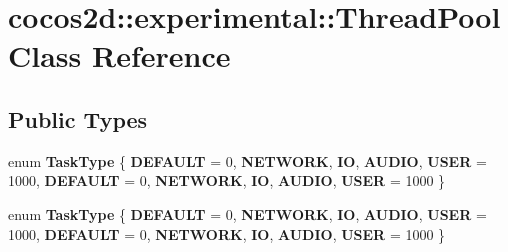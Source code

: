 \hypertarget{classcocos2d_1_1experimental_1_1ThreadPool}{}\section{cocos2d\+:\+:experimental\+:\+:Thread\+Pool Class Reference}
\label{classcocos2d_1_1experimental_1_1ThreadPool}
\subsection*{Public Types}
\begin{DoxyCompactItemize}
\item 
\mbox{\label{classcocos2d_1_1experimental_1_1ThreadPool_a0e578b9707fd927ab2413ffef9c3992e}} 
enum {\bfseries Task\+Type} \{ \newline
{\bfseries D\+E\+F\+A\+U\+LT} = 0, 
{\bfseries N\+E\+T\+W\+O\+RK}, 
{\bfseries IO}, 
{\bfseries A\+U\+D\+IO}, 
\newline
{\bfseries U\+S\+ER} = 1000, 
{\bfseries D\+E\+F\+A\+U\+LT} = 0, 
{\bfseries N\+E\+T\+W\+O\+RK}, 
{\bfseries IO}, 
\newline
{\bfseries A\+U\+D\+IO}, 
{\bfseries U\+S\+ER} = 1000
 \}
\item 
\mbox{\label{classcocos2d_1_1experimental_1_1ThreadPool_a0e578b9707fd927ab2413ffef9c3992e}} 
enum {\bfseries Task\+Type} \{ \newline
{\bfseries D\+E\+F\+A\+U\+LT} = 0, 
{\bfseries N\+E\+T\+W\+O\+RK}, 
{\bfseries IO}, 
{\bfseries A\+U\+D\+IO}, 
\newline
{\bfseries U\+S\+ER} = 1000, 
{\bfseries D\+E\+F\+A\+U\+LT} = 0, 
{\bfseries N\+E\+T\+W\+O\+RK}, 
{\bfseries IO}, 
\newline
{\bfseries A\+U\+D\+IO}, 
{\bfseries U\+S\+ER} = 1000
 \}
\end{DoxyCompactItemize}
